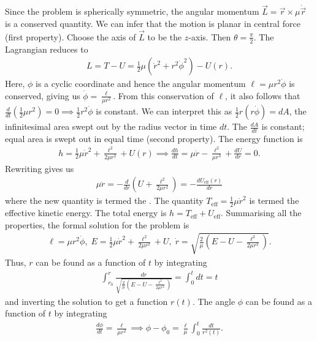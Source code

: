 Since the problem is spherically symmetric, the angular momentum $\vec{L} = \vec{r} \times \mu \dot{\vec{r}}$ is a conserved quantity. We can infer that the motion is planar in central force (first property). Choose the axis of $\vec{L}$ to be the $z$-axis. Then $\theta = \frac{\pi}{2}$. The Lagrangian reduces to
\begin{align}
    L = T-U = \frac{1}{2}\mu(\dot{r}^{2} + r^{2}\dot{\phi}^{2}) - U(r).
\end{align}
Here, $\phi$ is a cyclic coordinate and hence the angular momentum $\ell = \mu r^{2}\dot{\phi}$ is conserved, giving us $\dot{\phi} = \frac{\ell}{\mu r^{2}}$. From this conservation of $\ell$, it also follows that $\frac{d}{dt}(\frac{1}{2}\mu r^{2}) = 0 \implies \frac{1}{2}r^{2}\dot{\phi}$ is constant. We can interpret this as $\frac{1}{2}r(r\dot{\phi}) = dA$, the infinitesimal area swept out by the radius vector in time $dt$. The  $\frac{dA}{dt}$ is constant; equal area is swept out in equal time (second property). The energy function is
\begin{align}
    h = \frac{1}{2}\mu\dot{r}^{2} + \frac{\ell^{2}}{2\mu r^{2}} + U(r) \implies \frac{dh}{dt} = \mu\ddot{r} - \frac{\ell^{2}}{\mu r^{3}} + \frac{dU}{dr} = 0.
\end{align}
Rewriting gives us
\begin{align}
    \mu\ddot{r} = -\frac{d}{dr}\left( U + \frac{\ell^{2}}{2\mu r^{2}} \right) = -\frac{dU_{\text{eff}}(r)}{dr}
\end{align}
where the new quantity is termed the . The quantity $T_{\text{eff}} = \frac{1}{2}\mu\dot{r}^{2}$ is termed the effective kinetic energy. The total energy is $h = T_{\text{eff}} + U_{\text{eff}}$. Summarising all the properties, the formal solution for the problem is
\begin{align}
    \ell = \mu r^{2}\dot{\phi},\; E=\frac{1}{2}\mu \dot{r}^{2} + \frac{\ell^{2}}{2\mu r^{2}} + U,\; \dot{r} = \sqrt{\frac{2}{\mu}\left( E-U-\frac{\ell^{2}}{2 \mu r^{2}} \right)}.
\end{align}
Thus, $r$ can be found as a function of $t$ by integrating
\begin{align}
    \int_{r_{0}}^{r} \frac{dr}{\sqrt{\frac{2}{\mu}\left( E-U-\frac{\ell^{2}}{2 \mu r^{2}} \right)}} = \int_{0}^{t} dt = t
\end{align}
and inverting the solution to get a function $r(t)$. The angle $\phi$ can be found as a function of $t$ by integrating
\begin{align}
    \frac{d\phi}{dt} = \frac{\ell}{\mu r^{2}} \implies \phi - \phi_{0} = \frac{\ell}{\mu}\int_{0}^{t} \frac{dt}{r^{2}(t)}.
\end{align}
